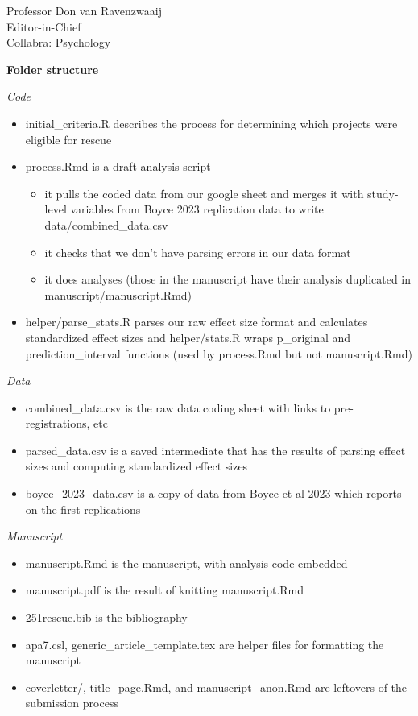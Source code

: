 \documentclass{stanfordletter}
\providecommand{\tightlist}{%
	\setlength{\itemsep}{0pt}\setlength{\parskip}{0pt}}
\begin{document}
\begin{letter}{Professor Don van Ravenzwaaij \\ Editor-in-Chief \\ Collabra: Psychology }
{			\textbf{\large Folder structure}\label{folder-structure}
			
			\textit{Code}\label{code}
			
			\begin{itemize}
				\tightlist
				\item
				initial\_criteria.R describes the process for determining which
				projects were eligible for rescue
				\item
				process.Rmd is a draft analysis script
				
				\begin{itemize}
					\tightlist
					\item
					it pulls the coded data from our google sheet and merges it with
					study-level variables from Boyce 2023 replication data to write
					data/combined\_data.csv
					\item
					it checks that we don't have parsing errors in our data format
					\item
					it does analyses (those in the manuscript have their analysis
					duplicated in manuscript/manuscript.Rmd)
				\end{itemize}
				\item
				helper/parse\_stats.R parses our raw effect size format and calculates
				standardized effect sizes and helper/stats.R wraps p\_original and
				prediction\_interval functions (used by process.Rmd but not
				manuscript.Rmd)
			\end{itemize}
			
			\textit{Data}\label{data}
			
			\begin{itemize}
				\tightlist
				\item
				combined\_data.csv is the raw data coding sheet with links to
				pre-registrations, etc
				\item
				parsed\_data.csv is a saved intermediate that has the results of
				parsing effect sizes and computing standardized effect sizes
				\item
				boyce\_2023\_data.csv is a copy of data from
				\href{https://royalsocietypublishing.org/doi/full/10.1098/rsos.231240}{Boyce
					et al 2023} which reports on the first replications
			\end{itemize}
			
			\textit{Manuscript}\label{manuscript}
			
			\begin{itemize}
				\tightlist
				\item
				manuscript.Rmd is the manuscript, with analysis code embedded
				\item
				manuscript.pdf is the result of knitting manuscript.Rmd
				\item
				251rescue.bib is the bibliography
				\item
				apa7.csl, generic\_article\_template.tex are helper files for
				formatting the manuscript
				\item
				coverletter/, title\_page.Rmd, and manuscript\_anon.Rmd are leftovers
				of the submission process
			\end{itemize}
			
}
\end{letter}
\end{document}
